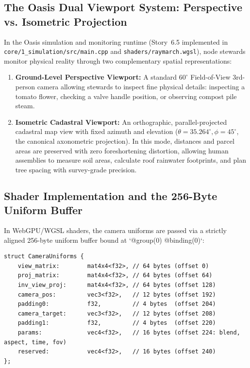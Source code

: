 \subsection{The Oasis Dual Viewport System: Perspective vs. Isometric Projection}
In the Oasis simulation and monitoring runtime (Story~6.5 implemented in \texttt{core/1\_simulation/src/main.cpp} and \texttt{shaders/raymarch.wgsl}), node stewards monitor physical reality through two complementary spatial representations:
\begin{enumerate}
    \item \textbf{Ground-Level Perspective Viewport:} A standard $60^\circ$ Field-of-View 3rd-person camera allowing stewards to inspect fine physical details: inspecting a tomato flower, checking a valve handle position, or observing compost pile steam.
    \item \textbf{Isometric Cadastral Viewport:} An orthographic, parallel-projected cadastral map view with fixed azimuth and elevation ($\theta = 35.264^\circ, \phi = 45^\circ$, the canonical axonometric projection). In this mode, distances and parcel areas are preserved with zero foreshortening distortion, allowing human assemblies to measure soil areas, calculate roof rainwater footprints, and plan tree spacing with survey-grade precision.
\end{enumerate}

\subsection{Shader Implementation and the 256-Byte Uniform Buffer}
In WebGPU/WGSL shaders, the camera uniforms are passed via a strictly aligned 256-byte uniform buffer bound at `@group(0) @binding(0)`:
\begin{verbatim}
struct CameraUniforms {
    view_matrix:        mat4x4<f32>, // 64 bytes (offset 0)
    proj_matrix:        mat4x4<f32>, // 64 bytes (offset 64)
    inv_view_proj:      mat4x4<f32>, // 64 bytes (offset 128)
    camera_pos:         vec3<f32>,   // 12 bytes (offset 192)
    padding0:           f32,         // 4 bytes  (offset 204)
    camera_target:      vec3<f32>,   // 12 bytes (offset 208)
    padding1:           f32,         // 4 bytes  (offset 220)
    params:             vec4<f32>,   // 16 bytes (offset 224: blend, aspect, time, fov)
    reserved:           vec4<f32>,   // 16 bytes (offset 240)
};
\end{verbatim}

